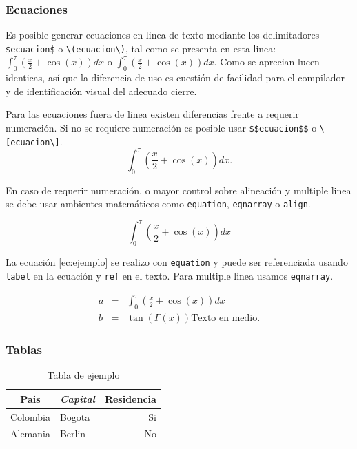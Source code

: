 \documentclass[12pt]{article}
\begin{document}
\subsubsection{Ecuaciones}

Es posible generar ecuaciones en linea de texto mediante los delimitadores \verb-$ecuacion$- o \verb-\(ecuacion\)-, tal como se presenta en esta linea: $\int_0^\tau\left(\frac{x}{2}+\cos(x)\right)dx$ o \(\int_0^\tau\left(\frac{x}{2}+\cos(x)\right)dx\). Como se aprecian lucen identicas, así que la diferencia de uso es cuestión de facilidad para el compilador y de identificación visual del adecuado cierre.

Para las ecuaciones fuera de linea existen diferencias frente a requerir numeración. Si no se requiere numeración es posible usar \verb-$$ecuacion$$- o \verb-\[ecuacion\]-. \[\int_0^\tau\left(\frac{x}{2}+\cos(x)\right)dx.\]

En caso de requerir numeración, o mayor control sobre alineación y multiple linea se debe usar ambientes matemáticos como \verb-equation-, \verb-eqnarray- o \verb-align-.

\begin{equation}
\int_0^\tau\left(\frac{x}{2}+\cos(x)\right)dx \label{ec:ejemplo}
\end{equation}

La ecuación \ref{ec:ejemplo} se realizo con \verb-equation- y puede ser referenciada usando \verb-label- en la ecuación y \verb-ref- en el texto. Para multiple linea usamos \verb-eqnarray-.

\begin{eqnarray*}
a & = & \int_0^\tau\left(\frac{x}{2}+\cos(x)\right)dx \\
b & = & \tan(\Gamma(x)) \text{Texto en medio.} %
\end{eqnarray*}

\subsubsection{Tablas}

\begin{table}[t]
\begin{center}
\begin{tabular}{|c|l|r|}
\hline
\textbf{Pais} & \textit{Capital} & \underline{Residencia}\\
\hline
Colombia & Bogota & Si\\
Alemania & Berlin & No\\
\hline
\end{tabular} \caption{Tabla de ejemplo} \label{t:ejemplo}
\end{center}
\end{table}
\end{document}
